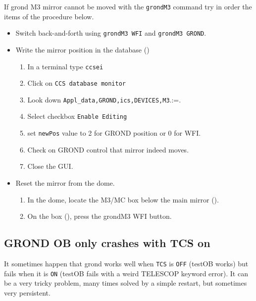 \documentclass[11pt,fleqn,a4paper]{book}
\makeatletter
\def\menu#1#2{\texttt{#1}\ifx{}#2\else\@for\@x:=#2\do{$\rightarrow$\texttt{\@x}}\fi}
\makeatother
\begin{document}
If \gls{grond} \gls{M3} mirror cannot be moved with the \texttt{\gls{grondM3}} command try in order the items of the procedure below.

\label{proc:grondM3stuck}
\begin{itemize}
  \item Switch back-and-forth using \texttt{\gls{grondM3} WFI} and \texttt{\gls{grondM3} GROND}.
  \item Write the mirror position in the database ()
    \begin{enumerate}
      \item In a terminal type \texttt{ccsei}
      \item Click on \texttt{CCS database monitor} 
      \item Look down \menu{Appl\_data,GROND,\gls{ics},DEVICES,\gls{M3}}.
      \item Select checkbox \texttt{Enable Editing}
      \item set \texttt{newPos} value to 2 for GROND position or 0 for WFI.
      \item Check on GROND control that mirror indeed moves.
      \item Close the GUI.
    \end{enumerate}
  \item Reset the mirror from the dome.
    \begin{enumerate}
       \item In the \gls{dome}, locate the \gls{M3}/MC box below the \gls{main mirror} ().
       \item On the box (), press the \gls{grondM3} WFI button.
    \end{enumerate}
\end{itemize}

\subsection{GROND OB only crashes with TCS on}

It sometimes happen that \gls{grond} works well when \texttt{TCS} is \texttt{OFF} (testOB works) but fails when it is \texttt{ON} (testOB fails with a weird TELESCOP keyword error). It can be a very tricky problem, many times solved by a simple restart, but sometimes very persistent. 
\end{document}
